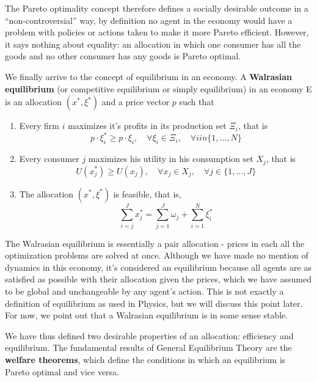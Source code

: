 The Pareto optimality concept therefore defines a socially desirable outcome in a ``non-controversial'' way, by definition no agent in the economy would have a problem with policies or actions taken to make it more Pareto efficient. However, it says nothing about equality: an allocation in which one consumer has all the goods and no other consumer has any goods is Pareto optimal.

We finally arrive to the concept of equilibrium in an economy. A \textbf{Walrasian equilibrium} (or competitive equilibrium or simply equilibrium) in an economy E is an allocation $(x^\ast, \xi^\ast)$ and a price vector $p$ such that

\begin{enumerate}
\item Every firm $i$ maximizes it's profits in its production set
  $\Xi_i$, that is
  \begin{equation}
    \label{eq:4}
    p\cdot \xi_i^\ast \geq p\cdot \xi_i, \quad \forall \xi_i \in
    \Xi_i,\quad \forall i in \{1, \ldots, N\} 
  \end{equation}
\item Every consumer $j$ maximizes his utility in his consumption set
  $X_j$, that is
  \begin{equation}
    \label{eq:1}
    U(x_j^\ast) \geq U(x_j), \quad \forall x_j \in X_j, \quad \forall
    j \in \{1,\ldots, J\}
  \end{equation}
\item The allocation $(x^\ast, \xi^\ast)$ is feasible, that is,
  \begin{equation}
    \label{eq:2}
    \sum_{i=j}^J x_j^\ast = \sum_{j=1}^J \omega_j + \sum_{i=1}^N \xi_i^\ast
  \end{equation}
\end{enumerate}

The Walrasian equilibrium is essentially a pair allocation - prices in each all the optimization problems are solved at once. Although we have made no mention of dynamics in this economy, it's considered an equilibrium because all agents are as satisfied as possible with their allocation given the prices, which we have assumed to be global and unchangeable by any agent's action. This is not exactly a definition of equilibrium as used in Physics, but we will discuss this point later. For now, we point out that a Walrasian equilibrium is in some sense stable.

We have thus defined two desirable properties of an allocation: efficiency and equilibrium. The fundamental results of General Equilibrium Theory are the \textbf{welfare theorems}, which define the conditions in which an equilibrium is Pareto optimal and vice versa.


